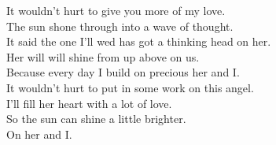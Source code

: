 


It wouldn't hurt to give you more of my love. \\
The sun shone through into a wave of thought. \\
It said the one I'll wed has got a thinking head on her. \\
Her will will shine from up above on us. \\

Because every day I build on precious her and I. \\
It wouldn't hurt to put in some work on this angel. \\
I'll fill her heart with a lot of love. \\
So the sun can shine a little brighter. \\

On her and I. \\
